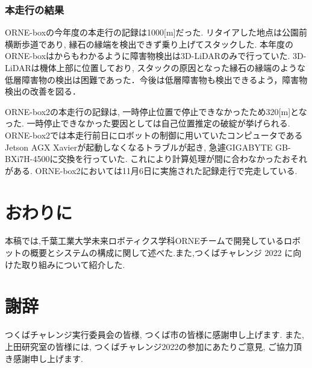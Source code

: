 \documentclass[uplatex, twocolumn, 9pt]{jsproceedings}
\begin{document}
\subsubsection{本走行の結果}
ORNE-boxの今年度の本走行の記録は1000[m]だった. リタイアした地点は公園前横断歩道であり, 縁石の縁端を検出できず乗り上げてスタックした. 本年度のORNE-boxはからもわかるように障害物検出は3D-LiDARのみで行っていた. 3D-LiDARは機体上部に位置しており, スタックの原因となった縁石の縁端のような低層障害物の検出は困難であった．今後は低層障害物も検出できるよう，障害物検出の改善を図る．\par
ORNE-box2の本走行の記録は, 一時停止位置で停止できなかったため320[m]となった. 一時停止できなかった要因としては自己位置推定の破綻が挙げられる. ORNE-box2では本走行前日にロボットの制御に用いていたコンピュータであるJetson AGX Xavierが起動しなくなるトラブルが起き, 急遽GIGABYTE GB-BXi7H-4500に交換を行っていた. これにより計算処理が間に合わなかったおそれがある. ORNE-box2においては11月6日に実施された記録走行で完走している. 

\section{おわりに}
本稿では,千葉工業大学未来ロボティクス学科ORNEチームで開発しているロボットの概要とシステムの構成に関して述べた.また,つくばチャレンジ 2022 に向けた取り組みについて紹介した.

\section{謝辞}
つくばチャレンジ実行委員会の皆様, つくば市の皆様に感謝申し上げます. また, 上田研究室の皆様には, つくばチャレンジ2022の参加にあたりご意見, ご協力頂き感謝申し上げます.

\end{document}
